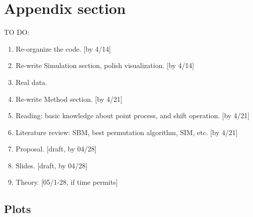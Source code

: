 
\appendix

\section{Appendix section}\label{app}

TO DO:
\begin{enumerate}
	\item Re-organize the code. [by 4/14]
	\item Re-write Simulation section, polish visualization. [by 4/14]
	\item Real data. 
	\item Re-write Method section. [by 4/21]
	\item Reading: basic knowledge about point process, and shift operation. [by 4/21] %
	\item Literature review: SBM, best permutation algorithm, SIM, etc. [by 4/21]
	\item Proposal. [draft, by 04/28]
	\item Slides. [draft, by 04/28]
	\item Theory. [05/1-28, if time permits]
\end{enumerate}

\subsection{Plots}



